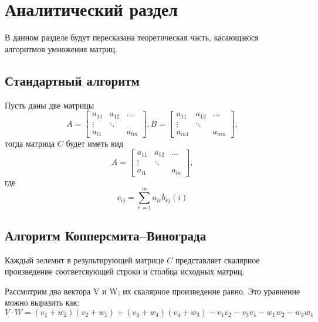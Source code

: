 \chapter{Аналитический раздел}
\label{cha:analysis}

В данном разделе будут пересказана теоретическая часть, касающаюся алгоритмов умножения матриц.

\section{Стандартный алгоритм}

Пусть даны две матрицы
\begin{equation} \label{eu_eqn}
A = \begin{bmatrix} 
    a_{11} & a_{12} & \dots \\
    \vdots & \ddots & \\
    a_{l1} &        & a_{lm} 
    \end{bmatrix},
B = \begin{bmatrix} 
a_{11} & a_{12} & \dots \\
\vdots & \ddots & \\
a_{m1} &        & a_{mn} 
\end{bmatrix},
\end{equation}
тогда матрица $C$ будет иметь вид
\begin{equation}
   A = \begin{bmatrix} 
    a_{11} & a_{12} & \dots \\
    \vdots & \ddots & \\
    a_{l1} &        & a_{ln} 
    \end{bmatrix}, 
\end{equation}
где
\begin{equation}
c_{ij} = \sum_{r=1}^{m}a_{ir}b_{rj} (i)
\end{equation}
\cite{stothers2010complexity_simple}

\section{Алгоритм Копперсмита--Винограда}
Каждый эелемнт в результирующей матрице $C$ представляет скалярное произведение соответсвующей строки и столбца исходных матриц.

Рассмотрим два вектора V и W; их скалярное произведение равно. Это уравнение можно выразить как: 
\begin{equation}
\label{eq4}
V \cdot W =(v_1 +w_2)(v_2 +w_1)+(v_3 +w_4)(v_4 +w_3)−v_1v_2 −v_3v_4 −w_1w_2 −w_3w_4
\end{equation}

